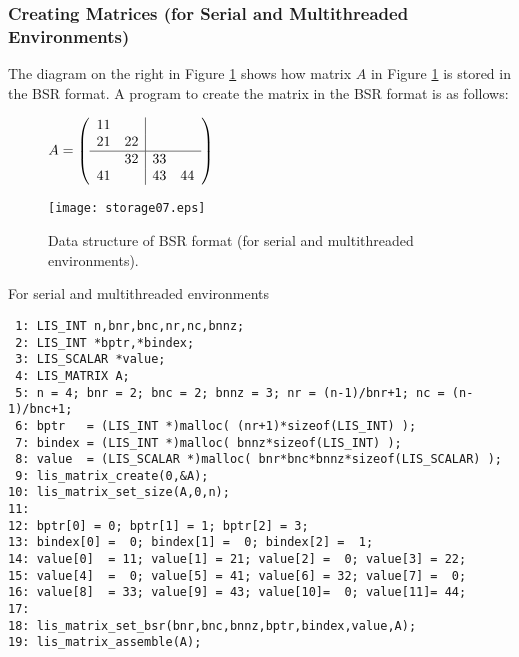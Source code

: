 \documentclass[a4paper]{article}
\begin{document}
\subsubsection{Creating Matrices (for Serial and Multithreaded Environments)}
The diagram on the right in Figure \ref{fig:storage07} shows how matrix $A$ in Figure \ref{fig:storage07} is stored in the BSR format. A program to create the matrix in the BSR format is as follows:
\begin{figure}[h]
{\centering 
\begin{minipage}{0.3\textwidth}
\begin{flushright}
$ 
A = \left(
\begin{array}{cc|cc}
11 &    &    &    \\
21 & 22 &    &    \\ \hline
   & 32 & 33 &    \\
41 &    & 43 & 44 \\
\end{array}\right)
$
\end{flushright}
\end{minipage}
\begin{minipage}{0.6\textwidth}
\begin{flushleft}
\texttt{[image: storage07.eps]} 
\end{flushleft}
\end{minipage}
\caption{Data structure of BSR format (for serial and multithreaded environments).}\label{fig:storage07}}
\end{figure}
\begin{itemsquarebox}[l]{For serial and multithreaded environments}
\small
\begin{verbatim}
 1: LIS_INT n,bnr,bnc,nr,nc,bnnz;
 2: LIS_INT *bptr,*bindex;
 3: LIS_SCALAR *value;
 4: LIS_MATRIX A;
 5: n = 4; bnr = 2; bnc = 2; bnnz = 3; nr = (n-1)/bnr+1; nc = (n-1)/bnc+1;
 6: bptr   = (LIS_INT *)malloc( (nr+1)*sizeof(LIS_INT) );
 7: bindex = (LIS_INT *)malloc( bnnz*sizeof(LIS_INT) );
 8: value  = (LIS_SCALAR *)malloc( bnr*bnc*bnnz*sizeof(LIS_SCALAR) );
 9: lis_matrix_create(0,&A);
10: lis_matrix_set_size(A,0,n);
11:
12: bptr[0] = 0; bptr[1] = 1; bptr[2] = 3;
13: bindex[0] =  0; bindex[1] =  0; bindex[2] =  1;
14: value[0]  = 11; value[1] = 21; value[2] =  0; value[3] = 22;
15: value[4]  =  0; value[5] = 41; value[6] = 32; value[7] =  0;
16: value[8]  = 33; value[9] = 43; value[10]=  0; value[11]= 44;
17:
18: lis_matrix_set_bsr(bnr,bnc,bnnz,bptr,bindex,value,A);
19: lis_matrix_assemble(A);
\end{verbatim}
\end{itemsquarebox}
\end{document}
